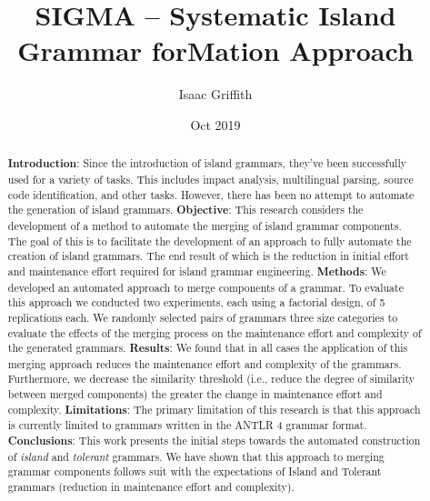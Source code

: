 \documentclass[10pt,nocc]{xrese_report}
\begin{document}
\frontmatter
{}



\title{SIGMA -- Systematic Island Grammar forMation Approach}

\date{Oct 2019}

\author{Isaac Griffith}




\maketitle
\tableofcontents
\listoffiguresandtables
\listofalgorithms

\mainmatter

\begin{abstract}
\textbf{Introduction}: Since the introduction of island grammars, they've been successfully used for a variety of tasks. This includes impact analysis, multilingual parsing, source code identification, and other tasks. However, there has been no attempt to automate the generation of island grammars.
\textbf{Objective}: This research considers the development of a method to automate the merging of island grammar components. The goal of this is to facilitate the development of an approach to fully automate the creation of island grammars. The end result of which is the reduction in initial effort and maintenance effort required for island grammar engineering. 
\textbf{Methods}: We developed an automated approach to merge components of a grammar. To evaluate this approach we conducted two experiments, each using a factorial design, of 5 replications each. We randomly selected pairs of grammars three size categories to evaluate the effects of the merging process on the maintenance effort and complexity of the generated grammars. 
\textbf{Results}: We found that in all cases the application of this merging approach reduces the maintenance effort and complexity of the grammars. Furthermore, we decrease the similarity threshold (i.e., reduce the degree of similarity between merged components) the greater the change in maintenance effort and complexity. 
\textbf{Limitations}: The primary limitation of this research is that this approach is currently limited to grammars written in the ANTLR 4 grammar format. 
\textbf{Conclusions}: This work presents the initial steps towards the automated construction of \textit{island} and \textit{tolerant} grammars. We have shown that this approach to merging grammar components follows suit with the expectations of Island and Tolerant grammars (reduction in maintenance effort and complexity).
\end{abstract}
\end{document}
